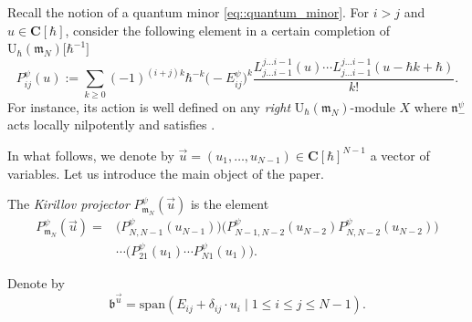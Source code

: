 \documentclass[10pt,a4paper]{article}
\numberwithin{equation}{section}
\newcommand{\C}{\mathbf{C}}
\newcommand{\U}{\mathrm{U}_{\hbar}}
\renewcommand{\b}{\mathfrak{b}}
\newcommand{\n}{\mathfrak{n}}
\newcommand{\m}{\mathfrak{m}}
\begin{document}
	
	Recall the notion of a quantum minor \eqref{eq::quantum_minor}. For $i>j$ and $u\in \C[\hbar]$, consider the following element in a certain completion of $\U(\m_N)\bigl[\hbar^{-1}\bigr]$
	\begin{equation}
		\label{eq::kirillov_proj_term}
		P^{\psi}_{ij}(u) := \sum\limits_{k\geq 0} (-1)^{(i+j)k} \hbar^{-k} \bigl(-E_{ij}^{\psi}\bigr)^k \frac{L_{j\dots i-1}^{j \dots i-1}(u) \cdots L_{j\dots i-1}^{j \dots i-1}(u - \hbar k+\hbar) }{k!}.
	\end{equation}
	For instance, its action is well defined on any \emph{right} $\U(\m_N)$-module $X$ where $\n_-^{\psi}$ acts locally nilpotently and satisfies \smash{$X\n_-^{\psi} \subset \hbar X$}.
	
	In what follows, we denote by $\vec{u}=(u_1,\dots,u_{N-1}) \in \C[\hbar]^{{N-1}}$ a vector of variables. Let us introduce the main object of the paper.
	\begin{Definition}
		\label{def::kirillov_projector}
		The \emph{Kirillov projector} $P_{\m_N}^{\psi}(\vec{u})$ is the element
		\begin{align}
				P_{\m_N}^{\psi}(\vec{u})={}&\bigl(P^{\psi}_{N,N-1}(u_{N-1}) \bigr) \bigl( P_{N-1,N-2}^{\psi}(u_{N-2}) P_{N,N-2}^{\psi}(u_{N-2}) \bigr)\nonumber\\& \cdots \bigl( P_{21}^{\psi}(u_1) \cdots P_{N1}^{\psi}(u_1)\bigr).\label{eq::kirillov_proj}
		\end{align}
	\end{Definition}
	
	
	Denote by
	\begin{equation}
		\label{eq::borel_u}
		\b^{\vec{u}} = \mathrm{span}(E_{ij} + \delta_{ij} \cdot u_i \mid 1\leq i \leq j \leq N-1).
	\end{equation}
	
\end{document}

